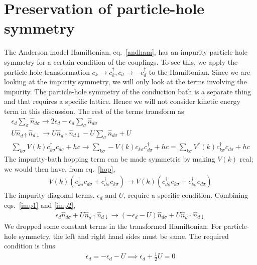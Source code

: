 \section{Preservation of particle-hole symmetry}
The Anderson model Hamiltonian, eq.~\ref{andham}, has an impurity particle-hole symmetry for a certain condition of the couplings. To see this, we apply the particle-hole transformation \(c_k \to c^\dagger_k, c_d \to -c^\dagger_d\) to the Hamiltonian. Since we are looking at the impurity symmetry, we will only look at the terms involving the impurity. The particle-hole symmetry of the conduction bath is a separate thing and that requires a specific lattice. Hence we will not consider kinetic energy term in this discussion. The rest of the terms transform as
\begin{gather}
    \epsilon_d \sum_\sigma \hat n_{d\sigma} \to 2\epsilon_d - \epsilon_d \sum_\sigma \hat n_{d\sigma}\label{imp1}\\
U \hat n_{d\uparrow}\hat n_{d\downarrow} \to U \hat n_{d\uparrow}\hat n_{d\downarrow} - U\sum_\sigma \hat n_{d\sigma} + U\label{imp2}\\
\sum_{k\sigma}V(k)c^\dagger_{k\sigma}c_{d\sigma} + hc \to \sum_{k\sigma}-V(k)c_{k\sigma}c^\dagger_{d\sigma} + hc = \sum_{k\sigma}V^*(k)c^\dagger_{k\sigma}c_{d\sigma} + hc \label{hop}
\end{gather}
The impurity-bath hopping term can be made symmetric by making \(V(k)\) real; we would then have, from eq.~\ref{hop},
\begin{equation}\begin{aligned}
	V(k)\left(c^\dagger_{k\sigma}c_{d\sigma} + c^\dagger_{d\sigma}c_{k\sigma}\right)\to V(k)\left(c^\dagger_{d\sigma}c_{k\sigma} + c^\dagger_{k\sigma}c_{d\sigma}\right)
\end{aligned}\end{equation}
The impurity diagonal terms, \(\epsilon_d\) and \(U\), require a specific condition. Combining eqs.~\ref{imp1} and \ref{imp2},
\begin{equation}\begin{aligned}
	\epsilon_d\hat n_{d\sigma} + U\hat n_{d\uparrow}\hat n_{d\downarrow} \to \left(-\epsilon_d - U\right)\hat n_{d\sigma} + U\hat n_{d\uparrow}\hat n_{d\downarrow}
\end{aligned}\end{equation}
We dropped some constant terms in the transformed Hamiltonian. For particle-hole symmetry, the left and right hand sides must be same. The required condition is thus 
\begin{equation}\begin{aligned}
	\label{phs}
\epsilon_d = -\epsilon_d - U \implies \epsilon_d + \frac{1}{2} U = 0
\end{aligned}\end{equation}
